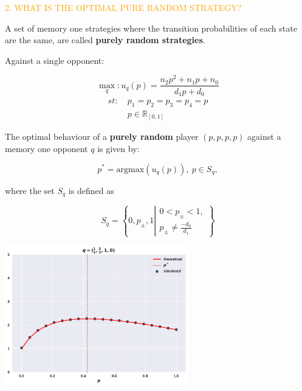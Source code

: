 \documentclass[usenames,dvipsnames,t]{beamer}
\newcommand{\R}{\mathbb{R}}
\begin{document}
\begin{columns}
\begin{column}{.45\linewidth}
        \textcolor{orange}{\large{2. WHAT IS THE OPTIMAL PURE RANDOM STRATEGY?}}
        \vspace{0.3cm}

        \small{
        A set of memory one strategies where the transition probabilities of each
        state are the same, are called \textbf{purely random strategies}.}
        \vspace{0.5cm}

        \textcolor{solarizedGreen}{Against a single opponent:}
        \vspace{0.3cm}

        \[ \max_q: u_q(p) = \frac{n_2p^2 + n_1p +n_0 } {d_1p + d_0}\]
        \begin{equation*}
            \begin{aligned}
                st: & \ p_1 = p_2 = p_3 = p_4 = p\\
                & \ p \in \R_{[0, 1]} 
            \end{aligned}
        \end{equation*}
        \vspace{0.3cm}

        \small{
        The optimal behaviour of a \textbf{purely random} player \((p, p, p, p)\)
        against a memory one opponent \(q\) is given by:}
        
        \[p^* = \text{argmax}(u_q(p)), \ p \in S_q,\]
        \vspace{0.3cm}

        \small{
        where the set \(S_q\) is defined as}
        
        \[S_q = \left \{0, p_{\pm}, 1 \left | \begin{array}{l} 0 < p_{\pm} < 1,
            \\ p_{\pm} \neq \frac{-d_0}{d_1} \end{array} \right. \right\}\]
        \vspace{0.5cm}
        
        \begin{center}
            \includegraphics[width=0.6\textwidth]{static/random_vs_one}
        \end{center}
        \vspace{0.5cm}


\end{column}
\end{columns}
\end{document}
